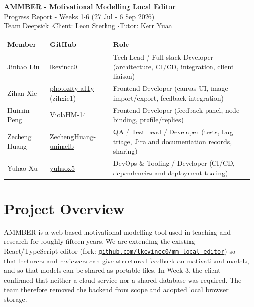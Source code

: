 \documentclass[10pt,a4paper]{article}
\newcommand{\ghbase}{https://github.com/lkevincc0/mm-local-editor}
\newcommand{\repo}{\href{\ghbase}{\nolinkurl{github.com/lkevincc0/mm-local-editor}}}
\begin{document}
\begin{center}
{\LARGE\bfseries\color{accent} AMMBER - Motivational Modelling Local Editor}\\[2pt]
{\normalsize Progress Report - Weeks 1-6 (27 Jul - 6 Sep 2026)}\\[2pt]
{\small\color{muted} Team Deepsick \quad$\cdot$\quad Client: Leon Sterling \quad$\cdot$\quad Tutor: Kerr Yuan}
\end{center}
\vspace{-4pt}

{\small
\begin{tabularx}{\textwidth}{@{}l l X@{}}
\toprule
\textbf{Member} & \textbf{GitHub} & \textbf{Role}\\
\midrule
Jinbao Liu & \href{https://github.com/lkevincc0}{lkevincc0} & Tech Lead / Full-stack Developer (architecture, CI/CD, integration, client liaison)\\
Zihan Xie & \href{https://github.com/photozity-a11y}{photozity-a11y} (zihxie1) & Frontend Developer (canvas UI, image import/export, feedback integration)\\
Huimin Peng & \href{https://github.com/ViolaHM-14}{ViolaHM-14} & Frontend Developer (feedback panel, node binding, profile/replies)\\
Zecheng Huang & \href{https://github.com/ZechengHuang-unimelb}{ZechengHuang-unimelb} & QA / Test Lead / Developer (tests, bug triage, Jira and documentation records, sharing)\\
Yuhao Xu & \href{https://github.com/yuhaox5}{yuhaox5} & DevOps \& Tooling / Developer (CI/CD, dependencies and deployment tooling)\\
\bottomrule
\end{tabularx}
}

\section{Project Overview}

AMMBER is a web-based motivational modelling tool used in teaching and research for roughly fifteen years. We are extending the existing React/TypeScript editor (fork: \repo) so that lecturers and reviewers can give structured feedback on motivational models, and so that models can be shared as portable files. In Week 3, the client confirmed that neither a cloud service nor a shared database was required. The team therefore removed the backend from scope and adopted local browser storage.
\end{document}
